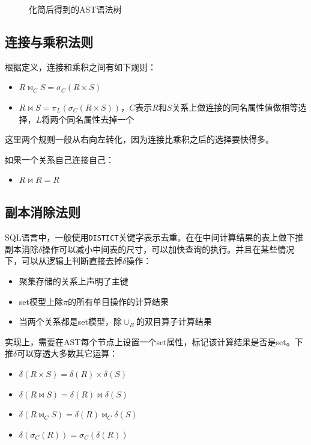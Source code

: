 \begin{figure}[H]
    \centering
    \caption{化简后得到的AST语法树}\label{fig:6-view-tree4}
\end{figure}

\subsection{连接与乘积法则}

根据定义，连接和乘积之间有如下规则：
\begin{itemize}
    \item $R \bowtie_C S = \sigma_C(R \times S)$
    \item $R \bowtie S = \pi_L(\sigma_C(R \times S))$，$C$表示$R$和$S$关系上做连接的同名属性值做相等选择，$L$将两个同名属性去掉一个
\end{itemize}
这里两个规则一般从右向左转化，因为连接比乘积之后的选择要快得多。

如果一个关系自己连接自己：
\begin{itemize}
    \item $R \bowtie R = R$
\end{itemize}

\subsection{副本消除法则}

SQL语言中，一般使用\texttt{DISTICT}关键字表示去重。在在中间计算结果的表上做下推副本消除$\delta$操作可以减小中间表的尺寸，可以加快查询的执行。并且在某些情况下，可以从逻辑上判断直接去掉$\delta$操作：
\begin{itemize}
    \item 聚集存储的关系上声明了主键
    \item set模型上除$\pi$的所有单目操作的计算结果
    \item 当两个关系都是set模型，除$\cup_B$的双目算子计算结果
\end{itemize}

实现上，需要在AST每个节点上设置一个set属性，标记该计算结果是否是set。下推$\delta$可以穿透大多数其它运算：
\begin{itemize}
    \item $\delta(R \times S) = \delta(R) \times \delta(S)$
    \item $\delta(R \bowtie S) = \delta(R) \bowtie \delta(S)$
    \item $\delta(R \bowtie_C S) = \delta(R) \bowtie_C \delta(S)$
    \item $\delta(\sigma_C(R)) = \sigma_C(\delta(R))$
\end{itemize}

